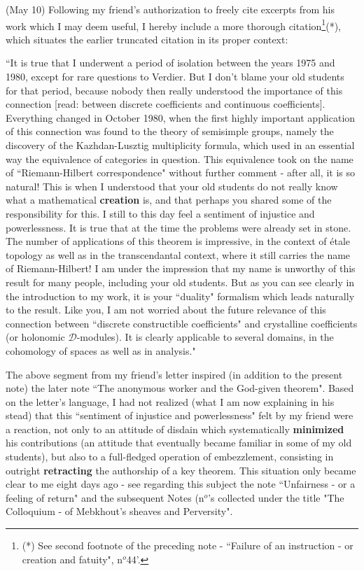 (May 10) Following my friend's authorization to freely cite excerpts from his work which I may deem useful, I hereby include a more thorough citation\footnote{(*) See second footnote of the preceding note - ``Failure of an instruction - or creation and fatuity", n$^o$44'.}(*), which situates the earlier truncated citation in its proper context:

\begin{adjustwidth}{1cm}{}
``It is true that I underwent a period of isolation between the years 1975 and 1980, except for rare questions to Verdier. But I don't blame your old students for that period, because nobody then really understood the importance of this connection [read: between discrete coefficients and continuous coefficients]. Everything changed in October 1980, when the first highly important application of this connection was found to the theory of semisimple groups, namely the discovery of the Kazhdan-Lusztig multiplicity formula, which used in an essential way the equivalence of categories in question. This equivalence took on the name of ``Riemann-Hilbert correspondence" without further comment - after all, it is so natural! This is when I understood that your old students do not really know what a mathematical \textbf{creation} is, and that perhaps you shared some of the responsibility for this. I still to this day feel a sentiment of injustice and powerlessness. It is true that at the time the problems were already set in stone. The number of applications of this theorem is impressive, in the context of \'etale topology as well as in the transcendantal context, where it still carries the name of Riemann-Hilbert! I am under the impression that my name is unworthy of this result for many people, including your old students. But as you can see clearly in the introduction to my work, it is your ``duality" formalism which leads naturally to the result. Like you, I am not worried about the future relevance of this connection between ``discrete constructible coefficients" and crystalline coefficients (or holonomic $\mathcal{D}$-modules). It is clearly applicable to several domains, in the cohomology of spaces as well as in analysis."
\end{adjustwidth}

The above segment from my friend's letter inspired (in addition to the present note) the
later note ``The anonymous worker and the God-given theorem". Based on the letter's
language, I had not realized (what I am now explaining in his stead) that this ``sentiment
of injustice and powerlessness" felt by my friend were a reaction, not only to an attitude
of disdain which systematically \textbf{minimized} his contributions (an attitude that
eventually became familiar in some of my old students), but also to a full-fledged
operation of embezzlement, consisting in outright \textbf{retracting} the authorship of a
key theorem. This situation only became clear to me eight days ago - see regarding this
subject the note ``Unfairness - or a feeling of return" and the subsequent Notes (n$^o$'s
collected under the title "The Colloquium - of Mebkhout's sheaves and Perversity".

